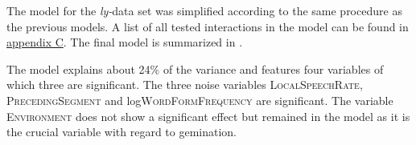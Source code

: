 The model for the \textit{ly-}data set was simplified according to the same procedure as the  previous models. A list of all tested interactions in the model can be found in \hyperref[Appendix C: Summaries of tested interactions in corpus study]{appendix C}. 
The final model is summarized in .


\begin{table}[h!]
	\caption{Summary of linear model for variables predicting the  duration of [l] in -suffixed words}
	\label{tbl: corpus summary model ly}
	\begin{center}
	\end{center}
\end{table}





The model explains about 24\% of the variance and features four variables of which three are significant. The three noise variables \textsc{LocalSpeechRate}, \textsc{PrecedingSegment} and log\textsc{WordFormFrequency} are significant. 
The variable \textsc{Environment} does not show a significant effect but remained in the model as it is the crucial variable with regard to gemination.

